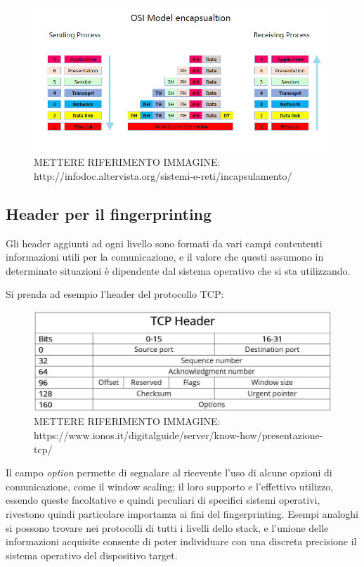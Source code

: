 \begin{figure}[h]
	\includegraphics[width=\textwidth]{figures/incapsulamento.png}
	\caption{METTERE RIFERIMENTO IMMAGINE: http://infodoc.altervista.org/sistemi-e-reti/incapsulamento/}
	\label{incapsulamento}
\end{figure}

\subsection{Header per il fingerprinting}
Gli header aggiunti ad ogni livello sono formati da vari campi contententi informazioni utili per la comunicazione, e il valore che questi assumono in determinate situazioni è dipendente dal sistema operativo che si sta utilizzando.

Si prenda ad esempio l'header del protocollo TCP:\\

\begin{figure}[H]
	\includegraphics[width=\textwidth]{figures/headerTCP.JPG}
	\caption{METTERE RIFERIMENTO IMMAGINE: https://www.ionos.it/digitalguide/server/know-how/presentazione-tcp/}
	\label{headerTCP}
\end{figure}

Il campo \textit{option} permette di segnalare al ricevente l'uso di alcune opzioni di comunicazione, come il window scaling; il loro supporto e l'effettivo utilizzo, essendo queste facoltative e quindi peculiari di specifici sistemi operativi, rivestono quindi particolare importanza ai fini del fingerprinting.
Esempi analoghi si possono trovare nei protocolli di tutti i livelli dello stack, e l'unione delle informazioni acquisite consente di poter individuare con una discreta precisione il sistema operativo del dispositivo target.